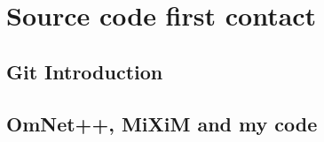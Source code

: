 \appendix
\chapter{Source code first contact}
\label{chap:installation}

\section{Git Introduction}

\section{OmNet++, \ac{MiXiM} and my code}
